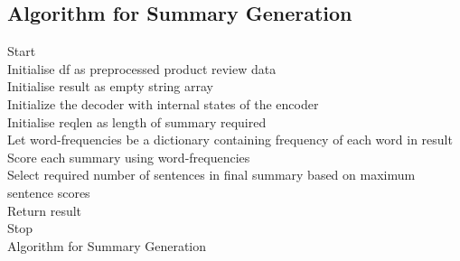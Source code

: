 \documentclass[11pt]{report}
\begin{document}
\subsection{Algorithm for Summary Generation}
\vspace{0.5cm}
\begin{algorithm}[H]
\SetAlgoLined
{}
Start \\
Initialise df as preprocessed product review data\\
Initialise result as empty string array \\
Initialize the decoder with internal states of the encoder \\
Initialise reqlen as length of summary required\\
Let word-frequencies be a dictionary containing frequency of each word in result \\
Score each summary using word-frequencies \\
Select required number of sentences in final summary based on maximum sentence scores\\
Return result\\
Stop \\
\caption{Algorithm for Summary Generation}
\end{algorithm}
\vspace{0.5cm}
\end{document}
